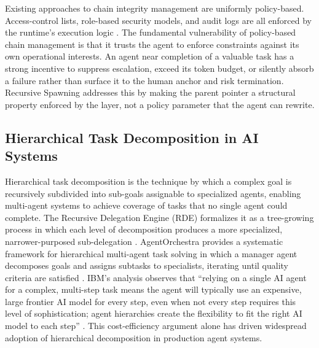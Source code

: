 Existing approaches to chain integrity management are uniformly policy-based.  Access-control lists, role-based security models, and audit logs are all enforced by the runtime's execution logic \cite{nist2023}.  The fundamental vulnerability of policy-based chain management is that it trusts the agent to enforce constraints against its own operational interests.  An agent near completion of a valuable task has a strong incentive to suppress escalation, exceed its token budget, or silently absorb a failure rather than surface it to the human anchor and risk termination.  Recursive Spawning addresses this by making the parent pointer a structural property enforced by the \fact{} layer, not a policy parameter that the agent can rewrite.

\subsection{Hierarchical Task Decomposition in AI Systems}\label{sec:task-decomposition}

Hierarchical task decomposition is the technique by which a complex goal is recursively subdivided into sub-goals assignable to specialized agents, enabling multi-agent systems to achieve coverage of tasks that no single agent could complete.  The Recursive Delegation Engine (RDE) formalizes it as a tree-growing process in which each level of decomposition produces a more specialized, narrower-purposed sub-delegation \cite{rde2025}.  AgentOrchestra provides a systematic framework for hierarchical multi-agent task solving in which a manager agent decomposes goals and assigns subtasks to specialists, iterating until quality criteria are satisfied \cite{agentorchestra2025}.  IBM's analysis observes that ``relying on a single AI agent for a complex, multi-step task means the agent will typically use an expensive, large frontier AI model for every step, even when not every step requires this level of sophistication; agent hierarchies create the flexibility to fit the right AI model to each step'' \cite{ibm2025hierarchical}.  This cost-efficiency argument alone has driven widespread adoption of hierarchical decomposition in production agent systems.


